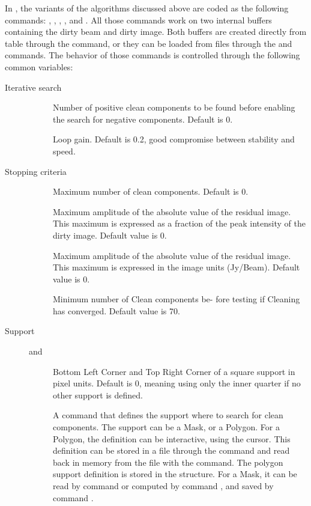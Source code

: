 In \imager{}, the variants of the \clean{} algorithms discussed above are
coded as the following commands: , , ,
,  and . All those commands work on two
internal buffers containing the dirty beam and dirty image. Both buffers
are created directly from \uv{} table through the  command, or
they can be loaded from files through the  and
 commands. The behavior of those commands is controlled
through the following common \sic{} variables:
\begin{description}
\item[Iterative search] \mbox{}
  \begin{description}
  \item[] Number of positive clean components to be found
    before enabling the search for negative components. Default is 0.
  \item[] Loop gain. Default is 0.2, good compromise between
    stability and speed.
  \end{description}

\item[Stopping criteria] \mbox{}
  \begin{description}
  \item[] Maximum number of clean components. Default is 0.
  \item[] Maximum amplitude of the absolute value of the
    residual image. This maximum is expressed as a fraction of the peak
    intensity of the dirty image. Default value is 0.
  \item[] Maximum amplitude of the absolute value of the
    residual image. This maximum is expressed in the image units (Jy/Beam).
    Default value is 0.
    \item[] Minimum number of Clean components be-
    fore testing if Cleaning has converged. Default value is 70. 
  \end{description}
  
\item[Support] \mbox{}
  \begin{description}
  \item[ and ] Bottom Left Corner and Top Right
    Corner of a square support in pixel units. Default is 0, meaning using 
    only the inner quarter if no other support is defined.
  \item[] A command that defines the support where
    to search for clean components. The support can be a Mask, or a
    Polygon. For a Polygon, the definition can be interactive,
    using the \greg{}  cursor. This definition can be stored in a file
    through the  command and read back in memory from
    the file with the  command. The polygon support definition is
    stored in the  structure. For a Mask, it can be
    read by command  or computed by command ,
    and saved by command .
  \end{description}


\end{description}

